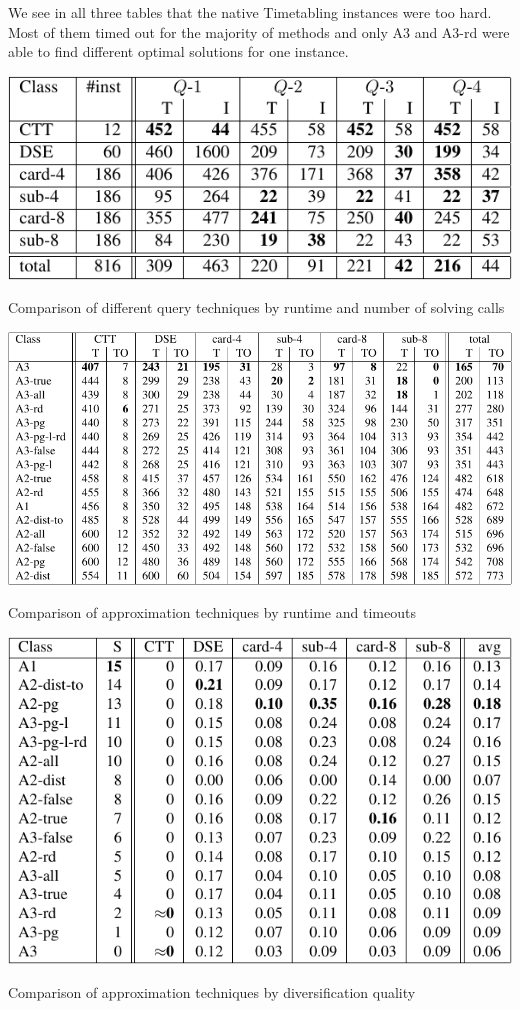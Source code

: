 We see in all three tables that the native Timetabling instances were too hard. 
Most of them timed out for the majority of methods and only A3 and A3-rd were able to find different optimal solutions for one instance. 


\begin{table}[H]
\includegraphics[width=\textwidth]{tables/query_comparison}
\caption{Comparison of different query techniques by runtime and number of solving calls}
\label{tab:query_comparison}
\end{table}

\begin{table}[H]
\includegraphics[width=\textwidth]{tables/time_comparison}
\caption{Comparison of approximation techniques by runtime and timeouts}
\label{tab:time_comparison}
\end{table}

\begin{table}[H]
\includegraphics[width=\textwidth]{tables/diverse_comparison}
\caption{Comparison of approximation techniques by diversification quality}
\label{tab:diverse_comparison}
\end{table}


